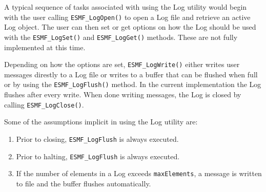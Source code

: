 

A typical sequence of tasks associated with using the Log utility would begin
with the user calling {\tt ESMF\_LogOpen()} to open a Log file and retrieve
an active Log object.  The user can then set or get options on how the Log
should be used with the {\tt ESMF\_LogSet()} and {\tt ESMF\_LogGet()} methods.
These are not fully implemented at this time. 

Depending on how the options are set, {\tt ESMF\_LogWrite()} either writes
user messages direstly to a Log file or writes to a buffer that can be flushed
when full or by using the {\tt ESMF\_LogFlush()} method.  In the current
implementation the Log flushes after every write.  When done writing
messages, the Log is closed by calling {\tt ESMF\_LogClose()}.  

Some of the assumptions implicit in using the Log utility are:

\begin{enumerate}

\item Prior to closing, {\tt ESMF\_LogFlush} is always executed.
\item Prior to halting, {\tt ESMF\_LogFlush} is always executed.
\item If the number of elements in a Log exceeds {\tt maxElements}, 
a message is written to file and the buffer flushes automatically.

\end{enumerate}


